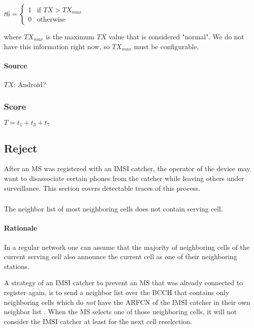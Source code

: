 \documentclass[a4paper,11pt,notitlepage,bigheadings,oneside]{scrartcl}
\begin{document}
$t6 =
\begin{cases}
	1 & \text{if } TX > TX_{max} \\
	0 & \text{otherwise}
\end{cases}$

where $TX_{max}$ is the maximum $TX$ value that is considered "normal". We do
not have this information right now, so $TX_{max}$ must be configurable.

\paragraph{Source}

$TX$: Android?


\subsubsection{Score}

$T = t_1 + t_3 + t_7$

\subsection{Reject}

After an MS was registered with an IMSI catcher, the operator of the device may
want to disassociate certain phones from the catcher while leaving others under
surveillance. This section covers detectable traces of this process.

\subsubsection{}

The neighbor list of most neighboring cells does not contain serving cell.

\paragraph{Rationale}

In a regular network one can assume that the majority of neighboring cells of
the current serving cell also announce the current cell as one of their
neighboring stations. 

A strategy of an IMSI catcher to prevent an MS that was already connected to
register again, is to send a neighbor list over the BCCH that contains only
neighboring cells which do \emph{not} have the ARFCN of the IMSI catcher in
their own neighbor list \cite[0027]{bott2000verfahren}. When the MS selects one of
those neighboring cells, it will not consider the IMSI catcher at least for the
next cell reselection.
\end{document}
